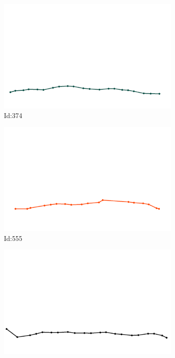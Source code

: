 \documentclass[12pt,twoside]{report}
\begin{document}
\begin{figure}
\centering
\begin{subfigure}[b]{0.20\textwidth}
\centering
\includegraphics[width=\textwidth]{../../trajectories/374.png}
\caption{Id:374}
\end{subfigure}
\begin{subfigure}[b]{0.20\textwidth}
\centering
\includegraphics[width=\textwidth]{../../trajectories/555.png}
\caption{Id:555}
\end{subfigure}
\begin{subfigure}[b]{0.20\textwidth}
\centering
\includegraphics[width=\textwidth]{../../trajectories/605.png}

\end{subfigure}
\end{figure}
\end{document}
